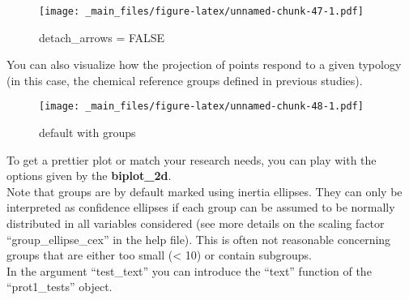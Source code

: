 \documentclass[12pt,]{book}
\newenvironment{Shaded}{\begin{snugshade}}{\end{snugshade}}
\newcommand{\DataTypeTok}[1]{\textcolor[rgb]{0.13,0.29,0.53}{#1}}
\newcommand{\DecValTok}[1]{\textcolor[rgb]{0.00,0.00,0.81}{#1}}
\newcommand{\FloatTok}[1]{\textcolor[rgb]{0.00,0.00,0.81}{#1}}
\newcommand{\KeywordTok}[1]{\textcolor[rgb]{0.13,0.29,0.53}{\textbf{#1}}}
\newcommand{\NormalTok}[1]{#1}
\newcommand{\OperatorTok}[1]{\textcolor[rgb]{0.81,0.36,0.00}{\textbf{#1}}}
\newcommand{\OtherTok}[1]{\textcolor[rgb]{0.56,0.35,0.01}{#1}}
\newcommand{\StringTok}[1]{\textcolor[rgb]{0.31,0.60,0.02}{#1}}
\begin{document}
\begin{figure}
\centering
\texttt{[image: \_main\_files/figure-latex/unnamed-chunk-47-1.pdf]}
\caption{\label{fig:unnamed-chunk-47}detach\_arrows = FALSE}
\end{figure}

\pagebreak

You can also visualize how the projection of points respond to a given typology (in this case, the chemical reference groups defined in previous studies).

\begin{Shaded}
\end{Shaded}

\begin{figure}
\centering
\texttt{[image: \_main\_files/figure-latex/unnamed-chunk-48-1.pdf]}
\caption{\label{fig:unnamed-chunk-48}default with groups}
\end{figure}

\pagebreak

To get a prettier plot or match your research needs, you can play with the options given by the \textbf{biplot\_2d}.\\
Note that groups are by default marked using inertia ellipses. They can only be interpreted as confidence ellipses if each group can be assumed to be normally distributed in all variables considered (see more details on the scaling factor ``group\_ellipse\_cex'' in the help file). This is often not reasonable concerning groups that are either too small (\textless{} 10) or contain subgroups.\\
In the argument ``test\_text'' you can introduce the ``text'' function of the ``prot1\_tests'' object.

\begin{Shaded}
\end{Shaded}
\end{document}
